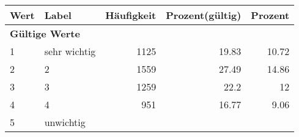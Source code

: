      \begin{longtable}{lXrrr}
     \toprule
     \textbf{Wert} & \textbf{Label} & \textbf{Häufigkeit} & \textbf{Prozent(gültig)} & \textbf{Prozent} \\
     \endhead
     \midrule
     \multicolumn{5}{l}{\textbf{Gültige Werte}}\\

     1 &
     \multicolumn{1}{X}{ sehr wichtig   } &


       \num{1125} &
       \num[round-mode=places,round-precision=2]{19,83} &
         \num[round-mode=places,round-precision=2]{10,72} \\

     2 &
     \multicolumn{1}{X}{ 2   } &


       \num{1559} &
       \num[round-mode=places,round-precision=2]{27,49} &
         \num[round-mode=places,round-precision=2]{14,86} \\

     3 &
     \multicolumn{1}{X}{ 3   } &


       \num{1259} &
       \num[round-mode=places,round-precision=2]{22,2} &
         \num[round-mode=places,round-precision=2]{12} \\

     4 &
     \multicolumn{1}{X}{ 4   } &


       \num{951} &
       \num[round-mode=places,round-precision=2]{16,77} &
         \num[round-mode=places,round-precision=2]{9,06} \\

     5 &
     \multicolumn{1}{X}{ unwichtig   } &



\end{longtable}
